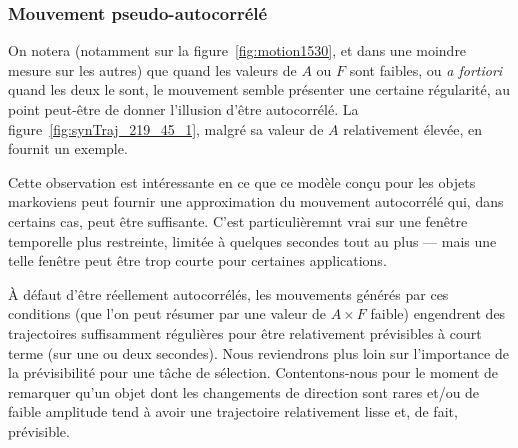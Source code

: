     \subsubsection{Mouvement pseudo-autocorrélé}
    On notera (notamment sur la figure~\ref{fig:motion1530}, et dans une moindre mesure sur les autres) que quand les valeurs de $A$ ou $F$ sont faibles, ou \emph{a fortiori} quand les deux le sont, le mouvement semble présenter une certaine régularité, au point peut-être de donner l'illusion d'être autocorrélé. La figure~\ref{fig:synTraj_219_45_1}, malgré sa valeur de $A$ relativement élevée, en fournit un exemple.
    
    Cette observation est intéressante en ce que ce modèle conçu pour les objets markoviens peut fournir une approximation du mouvement autocorrélé qui, dans certains cas, peut être suffisante. C'est particulièremnt vrai sur une fenêtre temporelle plus restreinte, limitée à quelques secondes tout au plus --- mais une telle fenêtre peut être trop courte pour certaines applications.
    
    À défaut d'être réellement autocorrélés, les mouvements générés par ces conditions (que l'on peut résumer par une valeur de $A \times F$ faible) engendrent des trajectoires suffisamment \og régulières \fg{} pour être relativement prévisibles à court terme (sur une ou deux secondes). Nous reviendrons plus loin sur l'importance de la prévisibilité pour une tâche de sélection. Contentons-nous pour le moment de remarquer qu'un objet dont les changements de direction sont rares et/ou de faible amplitude tend à avoir une trajectoire relativement \og lisse \fg{} et, de fait, prévisible.


